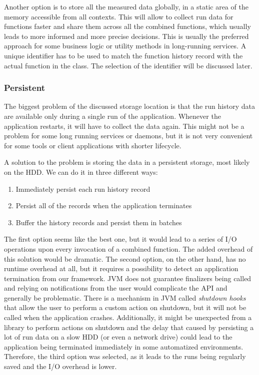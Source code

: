 Another option is to store all the measured data globally, in a static area of the memory accessible from all contexts. This will allow to collect run data for functions faster and share them across all the combined functions, which usually leads to more informed and more precise decisions. This is usually the preferred approach for some business logic or utility methods in long-running services. A unique identifier has to be used to match the function history record with the actual function in the  class. The selection of the identifier will be discussed later.

\subsubsection{Persistent}

The biggest problem of the discussed storage location is that the run history data are available only during a single run of the application. Whenever the application restarts, it will have to collect the data again. This might not be a problem for some long running services or daemons, but it is not very convenient for some tools or client applications with shorter lifecycle.

A solution to the problem is storing the data in a persistent storage, most likely on the HDD. We can do it in three different ways:

\begin{enumerate}
	\item Immediately persist each run history record
	\item Persist all of the records when the application terminates
	\item Buffer the history records and persist them in batches
\end{enumerate}

The first option seems like the best one, but it would lead to a series of I/O operations upon every invocation of a combined function. The added overhead of this solution would be dramatic. The second option, on the other hand, has no runtime overhead at all, but it requires a possibility to detect an application termination from our framework. JVM does not guarantee finalizers being called and relying on notifications from the user would complicate the API and generally be problematic. There is a mechanism in JVM called \textit{shutdown hooks} that allow the user to perform a custom action on shutdown, but it will not be called when the application crashes. Additionally, it might be unexpected from a library to perform actions on shutdown and the delay that caused by persisting a lot of run data on a slow HDD (or even a network drive) could lead to the application being terminated immediately in some automatized environments.
Therefore, the third option was selected, as it leads to the runs being regularly saved and the I/O overhead is lower.

